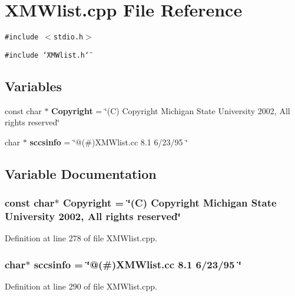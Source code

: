 \section{XMWlist.cpp File Reference}
\label{XMWlist_8cpp}
{\tt \#include $<$stdio.h$>$}\par
{\tt \#include \char`\"{}XMWlist.h\char`\"{}}\par
\subsection*{Variables}
\begin{CompactItemize}
\item 
const char $\ast$ {\bf Copyright} = \char`\"{}(C) Copyright Michigan State University 2002, All rights reserved\char`\"{}
\item 
char $\ast$ {\bf sccsinfo} = \char`\"{}@(\#)XMWlist.cc 8.1 6/23/95 \char`\"{}
\end{CompactItemize}


\subsection{Variable Documentation}
\subsubsection{\setlength{\rightskip}{0pt plus 5cm}const char$\ast$ Copyright = \char`\"{}(C) Copyright Michigan State University 2002, All rights reserved\char`\"{}\hspace{0.3cm}{\tt  [static]}}\label{XMWlist_8cpp_a0}




Definition at line 278 of file XMWlist.cpp.
\subsubsection{\setlength{\rightskip}{0pt plus 5cm}char$\ast$ sccsinfo = \char`\"{}@(\#)XMWlist.cc 8.1 6/23/95 \char`\"{}\hspace{0.3cm}{\tt  [static]}}\label{XMWlist_8cpp_a1}




Definition at line 290 of file XMWlist.cpp.